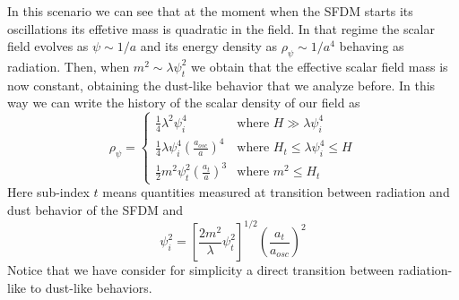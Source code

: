 \documentclass[amssymb,twocolumn,prd,nofootinbib,showpacs]{revtex4-1}
\begin{document}
\begin{itemize}
In this scenario we can see that at the moment when the SFDM starts its oscillations its effetive mass is quadratic in the field. In that regime the scalar field evolves as $\psi\sim 1/a$ and its energy density as $\rho_{\psi}\sim 1/a^4$ behaving as radiation. Then, when $m^2 \sim \lambda\psi_t^2$ we obtain that the effective scalar field mass is now constant, obtaining the dust-like behavior that we analyze before. In this way we can write the history of the scalar density of our field as
\begin{equation}\label{rhosfdmlam}
\rho_\psi = \left\lbrace\begin{array}{ll}
\frac{1}{4}\lambda^2\psi_i^4 & \text{where }H\gg \lambda\psi_i^4 \\
\frac{1}{4}\lambda\psi_i^4\left(\frac{a_{osc}}{a}\right)^4 & \text{where }H_t\leq \lambda\psi_i^4\leq H\\
\frac{1}{2}m^2\psi_t^2\left(\frac{a_t}{a}\right)^3 & \text{where } m^2\leq H_t
\end{array}\right .
\end{equation}
Here sub-index $t$ means quantities measured at transition between radiation and dust behavior of the SFDM and
\begin{equation}\label{inilamb}
\psi_i^2=\left[\frac{2m^2}{\lambda}\psi_t^2\right]^{1/2}\left(\frac{a_t}{a_{osc}}\right)^2
\end{equation}
Notice that we have consider for simplicity a direct transition between radiation-like to dust-like behaviors. 


\end{itemize}
\end{document}
